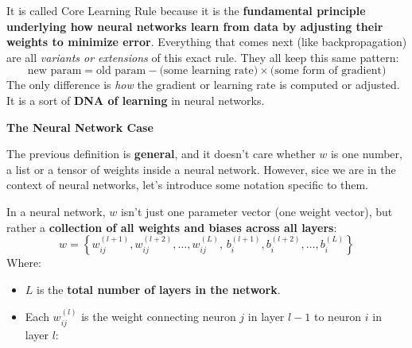 \begin{definitionbox}
    It is called Core Learning Rule because it is the \textbf{fundamental principle underlying how neural networks learn from data by adjusting their weights to minimize error}. Everything that comes next (like backpropagation) are all \emph{variants or extensions} of this exact rule. They all keep this same pattern:
    \begin{equation*}
        \text{new param} = \text{old param} - \text{(some learning rate)} \times \text{(some form of gradient)}
    \end{equation*}
    The only difference is \emph{how} the gradient or learning rate is computed or adjusted. It is a sort of \textbf{DNA of learning} in neural networks.

    \highspace
    \begin{flushleft}
        \textcolor{Green3}{ \textbf{The Neural Network Case}}
    \end{flushleft}
    The previous definition is \textbf{general}, and it doesn't care whether $w$ is one number, a list or a tensor of weights inside a neural network. However, sice we are in the context of neural networks, let's introduce some notation specific to them.

    In a neural network, $w$ isn't just one parameter vector (one weight vector), but rather a \textbf{collection of all weights and biases across all layers}:
    \begin{equation}
        w = \left\{
            w_{ij}^{(l+1)}, w_{ij}^{(l+2)}, \ldots, w_{ij}^{(L)}, \,
            b_{i}^{(l+1)}, b_{i}^{(l+2)}, \ldots, b_{i}^{(L)}
        \right\}
    \end{equation}
    Where:
    \begin{itemize}
        \item $L$ is the \textbf{total number of layers in the network}.
        \item Each $w_{ij}^{(l)}$ is the weight connecting neuron $j$ in layer $l-1$ to neuron $i$ in layer $l$:
        \begin{center}
\end{center}
\end{itemize}
\end{definitionbox}
